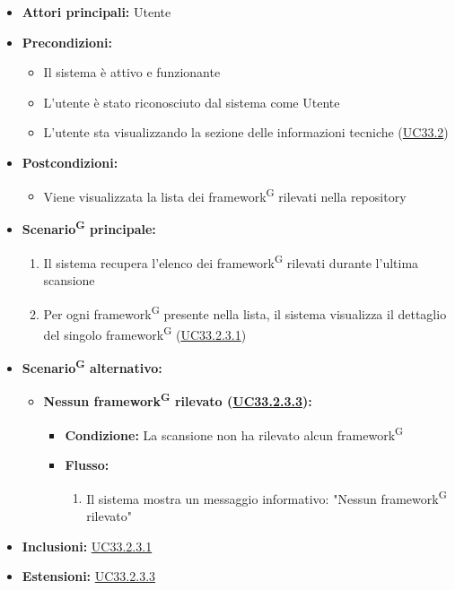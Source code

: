 \documentclass[a4paper, 11pt]{article}
\begin{document}
\begin{itemize}
    \item \textbf{Attori principali:} Utente
    \item \textbf{Precondizioni:}
    \begin{itemize}
        \item Il sistema è attivo e funzionante
        \item L'utente è stato riconosciuto dal sistema come Utente
        \item L'utente sta visualizzando la sezione delle informazioni tecniche (\hyperref[UC33.2]{UC33.2})
    \end{itemize}
    \item \textbf{Postcondizioni:}
    \begin{itemize}
        \item Viene visualizzata la lista dei framework\textsuperscript{G} rilevati nella repository
    \end{itemize}
    \item \textbf{Scenario\textsuperscript{G} principale:}
    \begin{enumerate}
        \item Il sistema recupera l'elenco dei framework\textsuperscript{G} rilevati durante l'ultima scansione
        \item Per ogni framework\textsuperscript{G} presente nella lista, il sistema visualizza il dettaglio del singolo framework\textsuperscript{G} (\hyperref[UC33.2.3.1]{UC33.2.3.1})
    \end{enumerate}
    \item \textbf{Scenario\textsuperscript{G} alternativo:}
    \begin{itemize}
        \item \textbf{Nessun framework\textsuperscript{G} rilevato (\hyperref[UC33.2.3.3]{UC33.2.3.3}):}
        \begin{itemize}
            \item \textbf{Condizione:} La scansione non ha rilevato alcun framework\textsuperscript{G}
            \item \textbf{Flusso:}
            \begin{enumerate}
                \item Il sistema mostra un messaggio informativo: "Nessun framework\textsuperscript{G} rilevato"
            \end{enumerate}
        \end{itemize}
    \end{itemize}
    \item \textbf{Inclusioni:} \hyperref[UC33.2.3.1]{UC33.2.3.1}
    \item \textbf{Estensioni:} \hyperref[UC33.2.3.3]{UC33.2.3.3}
\end{itemize}
\end{document}
